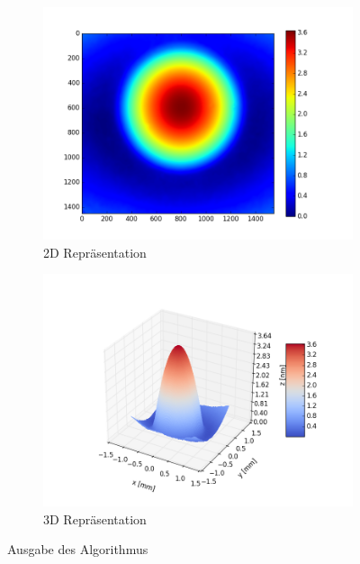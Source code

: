 \begin{figure}[htbp]
	\centering
	\begin{subfigure}[b]{0.35\textwidth}
		\centering
		\includegraphics[width=\textwidth]{img/2D_E10001_edf_ref_start0001_1-10_edf}
		\caption[2D Ausgabe]{2D Repräsentation}
		\label{fig:ausgabe_2d}
	\end{subfigure}
	\begin{subfigure}[b]{0.35\textwidth}
		\centering
		\includegraphics[width=\textwidth]{img/3D_E10001_edf_ref_start0001_1-10_edf}
		\caption[3D Ausgabe]{3D Repräsentation}
		\label{fig:ausgabe_3d}
	\end{subfigure}
	\caption[Ausgabe]{Ausgabe des Algorithmus}
	\label{fig:ausgabebild}
\end{figure}

